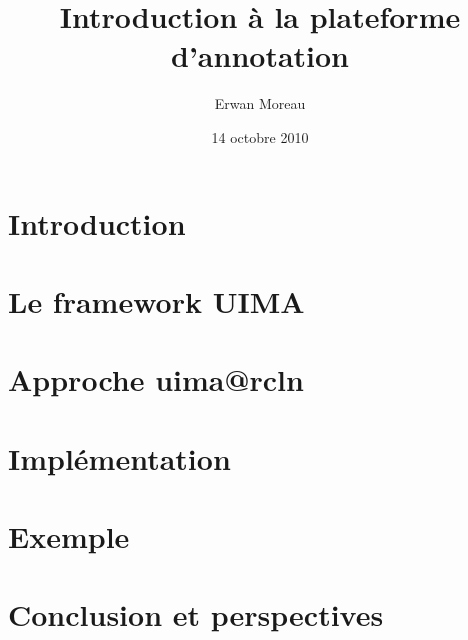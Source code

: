 \documentclass[pdf]{beamer}
\title{Introduction à la plateforme d'annotation \softName}
\author{Erwan Moreau}
\date{14 octobre 2010}
\institute{
Université Paris 13 \& UMR CNRS 7030\\
\url{erwan.moreau@lipn.univ-paris13.fr}
}
\makeatletter
\newcommand{\softName}{uima@rcln\xspace}
\makeatother
\begin{document}
\frame{
\titlepage
}

\section{Introduction}


\section{Le framework UIMA}


\section{Approche \softName} 



\section{Implémentation}


\section{Exemple}


\section{Conclusion et perspectives}

\end{document}
